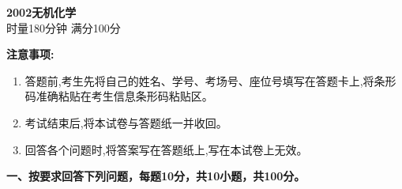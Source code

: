 \begin{center}
    {\LARGE \textbf{2002无机化学}} \\[2ex]
    {\large 时量180分钟 \quad 满分100分}
\end{center}

\vspace{0.5cm}
\noindent\textbf{注意事项:}
\begin{enumerate}[label=\arabic*., parsep=0pt, itemsep=0pt]
    \item 答题前,考生先将自己的姓名、学号、考场号、座位号填写在答题卡上,将条形码准确粘贴在考生信息条形码粘贴区。
    \item 考试结束后,将本试卷与答题纸一并收回。
    \item 回答各个问题时,将答案写在答题纸上,写在本试卷上无效。
\end{enumerate}

\vspace{0.5cm}
\noindent\textbf{一、按要求回答下列问题，每题10分，共10小题，共100分。}


